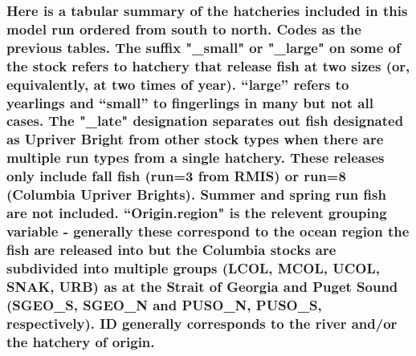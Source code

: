 \documentclass[]{article}
\begin{document}
\newpage

\hypertarget{here-is-a-tabular-summary-of-the-hatcheries-included-in-this-model-run-ordered-from-south-to-north.-codes-as-the-previous-tables.-the-suffix-_small-or-_large-on-some-of-the-stock-refers-to-hatchery-that-release-fish-at-two-sizes-or-equivalently-at-two-times-of-year.-large-refers-to-yearlings-and-small-to-fingerlings-in-many-but-not-all-cases.-the-_late-designation-separates-out-fish-designated-as-upriver-bright-from-other-stock-types-when-there-are-multiple-run-types-from-a-single-hatchery.-these-releases-only-include-fall-fish-run3-from-rmis-or-run8-columbia-upriver-brights.-summer-and-spring-run-fish-are-not-included.-origin.region-is-the-relevent-grouping-variable---generally-these-correspond-to-the-ocean-region-the-fish-are-released-into-but-the-columbia-stocks-are-subdivided-into-multiple-groups-lcol-mcol-ucol-snak-urb-as-at-the-strait-of-georgia-and-puget-sound-sgeo_s-sgeo_n-and-puso_n-puso_s-respectively.-id-generally-corresponds-to-the-river-andor-the-hatchery-of-origin.}{%
\subsubsection{Here is a tabular summary of the hatcheries included in
this model run ordered from south to north. Codes as the previous
tables. The suffix "\_small" or "\_large" on some of the stock refers to
hatchery that release fish at two sizes (or, equivalently, at two times
of year). ``large'' refers to yearlings and ``small'' to fingerlings in
many but not all cases. The "\_late" designation separates out fish
designated as Upriver Bright from other stock types when there are
multiple run types from a single hatchery. These releases only include
fall fish (run=3 from RMIS) or run=8 (Columbia Upriver Brights). Summer
and spring run fish are not included. ``Origin.region" is the relevent
grouping variable - generally these correspond to the ocean region the
fish are released into but the Columbia stocks are subdivided into
multiple groups (LCOL, MCOL, UCOL, SNAK, URB) as at the Strait of
Georgia and Puget Sound (SGEO\_S, SGEO\_N and PUSO\_N, PUSO\_S,
respectively). ID generally corresponds to the river and/or the hatchery
of
origin.}\label{here-is-a-tabular-summary-of-the-hatcheries-included-in-this-model-run-ordered-from-south-to-north.-codes-as-the-previous-tables.-the-suffix-_small-or-_large-on-some-of-the-stock-refers-to-hatchery-that-release-fish-at-two-sizes-or-equivalently-at-two-times-of-year.-large-refers-to-yearlings-and-small-to-fingerlings-in-many-but-not-all-cases.-the-_late-designation-separates-out-fish-designated-as-upriver-bright-from-other-stock-types-when-there-are-multiple-run-types-from-a-single-hatchery.-these-releases-only-include-fall-fish-run3-from-rmis-or-run8-columbia-upriver-brights.-summer-and-spring-run-fish-are-not-included.-origin.region-is-the-relevent-grouping-variable---generally-these-correspond-to-the-ocean-region-the-fish-are-released-into-but-the-columbia-stocks-are-subdivided-into-multiple-groups-lcol-mcol-ucol-snak-urb-as-at-the-strait-of-georgia-and-puget-sound-sgeo_s-sgeo_n-and-puso_n-puso_s-respectively.-id-generally-corresponds-to-the-river-andor-the-hatchery-of-origin.}}
\end{document}
